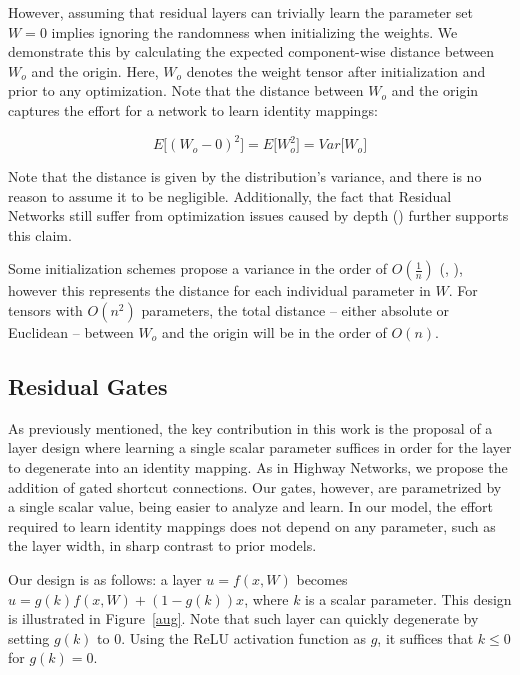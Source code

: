 \documentclass{article} \RequirePackage{amsmath,amsthm,amsfonts,amssymb}
\begin{document}
However, assuming that residual layers can trivially learn the parameter set $W = 0$ implies ignoring the randomness when initializing the weights. We demonstrate this by calculating the expected component-wise distance between $W_{o}$ and the origin. Here, $W_{o}$ denotes the weight tensor after initialization and prior to any optimization. Note that the distance between $W_{o}$ and the origin captures the effort for a network to learn identity mappings:

\begin{equation*}
	E \Big [  (W_{o} - 0)^2  \Big ] = E \Big [  W_{o}^2  \Big ] =  Var \Big [  W_{o}  \Big ]
\end{equation*}

Note that the distance is given by the distribution's variance, and there is no reason to assume it to be negligible. Additionally, the fact that Residual Networks still suffer from optimization issues caused by depth (\cite{stdepth}) further supports this claim. 

Some initialization schemes propose a variance in the order of $O(\frac{1}{n})$ (\cite{glorotinit}, \cite{prelu}), however this represents the distance for each individual parameter in $W$. For tensors with $O(n^2)$ parameters, the total distance --  either absolute or Euclidean --  between $W_{o}$ and the origin will be in the order of $O(n)$.


\subsection{Residual Gates}

As previously mentioned, the key contribution in this work is the proposal of a layer design where learning a single scalar parameter suffices in order for the layer to degenerate into an identity mapping. As in Highway Networks, we propose the addition of gated shortcut connections. Our gates, however, are parametrized by a single scalar value, being easier to analyze and learn. In our model, the effort required to learn identity mappings does not depend on any parameter, such as the layer width, in sharp contrast to prior models.

Our design is as follows: a layer $u = f(x,W)$ becomes $u = g(k) f(x,W) + (1 - g(k)) x$, where $k$ is a scalar parameter. This design is illustrated in Figure~\ref{aug}. Note that such layer can quickly degenerate by setting $g(k)$ to $0$. Using the ReLU activation function as $g$, it suffices that $k \leq 0$ for $g(k) = 0$.
\end{document}

